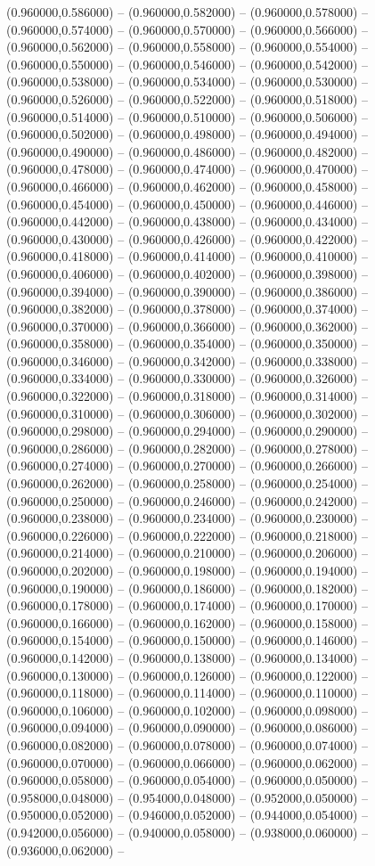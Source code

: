 (0.960000,0.586000) -- (0.960000,0.582000) -- (0.960000,0.578000) -- (0.960000,0.574000) -- (0.960000,0.570000) -- (0.960000,0.566000) -- (0.960000,0.562000) -- (0.960000,0.558000) -- (0.960000,0.554000) -- (0.960000,0.550000) -- (0.960000,0.546000) -- (0.960000,0.542000) -- (0.960000,0.538000) -- (0.960000,0.534000) -- (0.960000,0.530000) -- (0.960000,0.526000) -- (0.960000,0.522000) -- (0.960000,0.518000) -- (0.960000,0.514000) -- (0.960000,0.510000) -- (0.960000,0.506000) -- (0.960000,0.502000) -- (0.960000,0.498000) -- (0.960000,0.494000) -- (0.960000,0.490000) -- (0.960000,0.486000) -- (0.960000,0.482000) -- (0.960000,0.478000) -- (0.960000,0.474000) -- (0.960000,0.470000) -- (0.960000,0.466000) -- (0.960000,0.462000) -- (0.960000,0.458000) -- (0.960000,0.454000) -- (0.960000,0.450000) -- (0.960000,0.446000) -- (0.960000,0.442000) -- (0.960000,0.438000) -- (0.960000,0.434000) -- (0.960000,0.430000) -- (0.960000,0.426000) -- (0.960000,0.422000) -- (0.960000,0.418000) -- (0.960000,0.414000) -- (0.960000,0.410000) -- (0.960000,0.406000) -- (0.960000,0.402000) -- (0.960000,0.398000) -- (0.960000,0.394000) -- (0.960000,0.390000) -- (0.960000,0.386000) -- (0.960000,0.382000) -- (0.960000,0.378000) -- (0.960000,0.374000) -- (0.960000,0.370000) -- (0.960000,0.366000) -- (0.960000,0.362000) -- (0.960000,0.358000) -- (0.960000,0.354000) -- (0.960000,0.350000) -- (0.960000,0.346000) -- (0.960000,0.342000) -- (0.960000,0.338000) -- (0.960000,0.334000) -- (0.960000,0.330000) -- (0.960000,0.326000) -- (0.960000,0.322000) -- (0.960000,0.318000) -- (0.960000,0.314000) -- (0.960000,0.310000) -- (0.960000,0.306000) -- (0.960000,0.302000) -- (0.960000,0.298000) -- (0.960000,0.294000) -- (0.960000,0.290000) -- (0.960000,0.286000) -- (0.960000,0.282000) -- (0.960000,0.278000) -- (0.960000,0.274000) -- (0.960000,0.270000) -- (0.960000,0.266000) -- (0.960000,0.262000) -- (0.960000,0.258000) -- (0.960000,0.254000) -- (0.960000,0.250000) -- (0.960000,0.246000) -- (0.960000,0.242000) -- (0.960000,0.238000) -- (0.960000,0.234000) -- (0.960000,0.230000) -- (0.960000,0.226000) -- (0.960000,0.222000) -- (0.960000,0.218000) -- (0.960000,0.214000) -- (0.960000,0.210000) -- (0.960000,0.206000) -- (0.960000,0.202000) -- (0.960000,0.198000) -- (0.960000,0.194000) -- (0.960000,0.190000) -- (0.960000,0.186000) -- (0.960000,0.182000) -- (0.960000,0.178000) -- (0.960000,0.174000) -- (0.960000,0.170000) -- (0.960000,0.166000) -- (0.960000,0.162000) -- (0.960000,0.158000) -- (0.960000,0.154000) -- (0.960000,0.150000) -- (0.960000,0.146000) -- (0.960000,0.142000) -- (0.960000,0.138000) -- (0.960000,0.134000) -- (0.960000,0.130000) -- (0.960000,0.126000) -- (0.960000,0.122000) -- (0.960000,0.118000) -- (0.960000,0.114000) -- (0.960000,0.110000) -- (0.960000,0.106000) -- (0.960000,0.102000) -- (0.960000,0.098000) -- (0.960000,0.094000) -- (0.960000,0.090000) -- (0.960000,0.086000) -- (0.960000,0.082000) -- (0.960000,0.078000) -- (0.960000,0.074000) -- (0.960000,0.070000) -- (0.960000,0.066000) -- (0.960000,0.062000) -- (0.960000,0.058000) -- (0.960000,0.054000) -- (0.960000,0.050000) -- (0.958000,0.048000) -- (0.954000,0.048000) -- (0.952000,0.050000) -- (0.950000,0.052000) -- (0.946000,0.052000) -- (0.944000,0.054000) -- (0.942000,0.056000) -- (0.940000,0.058000) -- (0.938000,0.060000) -- (0.936000,0.062000) -- 